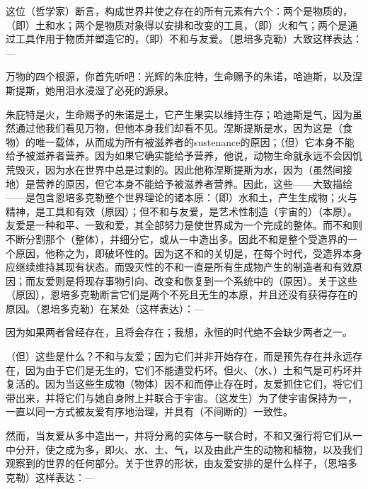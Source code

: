 这位（哲学家）断言，构成世界并使之存在的所有元素有六个：两个是物质的，（即）土和水；两个是物质对象得以安排和改变的工具，（即）火和气；两个是通过工具作用于物质并塑造它的，（即）不和与友爱。（恩培多克勒）大致这样表达：—\par

万物的四个根源，你首先听吧：\newline{}光辉的朱庇特，生命赐予的朱诺，哈迪斯，\newline{}以及涅斯提斯，她用泪水浸湿了必死的源泉。\par

朱庇特是火，生命赐予的朱诺是土，它产生果实以维持生存；哈迪斯是气，因为虽然通过他我们看见万物，但他本身我们却看不见。涅斯提斯是水，因为这是（食物）的唯一载体，从而成为所有被滋养者的sustenance的原因；（但）它本身不能给予被滋养者营养。因为如果它确实能给予营养，他说，动物生命就永远不会因饥荒毁灭，因为水在世界中总是过剩的。因此他称涅斯提斯为水，因为（虽然间接地）是营养的原因，但它本身不能给予被滋养者营养。因此，这些——大致描绘——是包含恩培多克勒整个世界理论的诸本原：（即）水和土，产生生成物；火与精神，是工具和有效（原因）；但不和与友爱，是艺术性制造（宇宙的）（本原）。友爱是一种和平、一致和爱，其全部努力是使世界成为一个完成的整体。而不和则不断分割那个（整体），并细分它，或从一中造出多。因此不和是整个受造界的一个原因，他称之为，即破坏性的。因为这不和的关切是，在每个时代，受造界本身应继续维持其现有状态。而毁灭性的不和一直是所有生成物产生的制造者和有效原因；而友爱则是将现存事物引向、改变和恢复到一个系统中的（原因）。关于这些（原因），恩培多克勒断言它们是两个不死且无生的本原，并且还没有获得存在的原因。（恩培多克勒）在某处（这样表达）：—\par

因为如果两者曾经存在，且将会存在；我想，\newline{}永恒的时代绝不会缺少两者之一。\par

（但）这些是什么？不和与友爱；因为它们并非开始存在，而是预先存在并永远存在，因为由于它们是无生的，它们不能遭受朽坏。但火、（水、）土和气是可朽坏并复活的。因为当这些生成物（物体）因不和而停止存在时，友爱抓住它们，将它们带出来，并将它们与她自身附上并联合于宇宙。（这发生）为了使宇宙保持为一，一直以同一方式被友爱有序地治理，并具有（不间断的）一致性。\par

然而，当友爱从多中造出一，并将分离的实体与一联合时，不和又强行将它们从一中分开，使之成为多，即火、水、土、气，以及由此产生的动物和植物，以及我们观察到的世界的任何部分。关于世界的形状，由友爱安排的是什么样子，（恩培多克勒）这样表达：—\par

